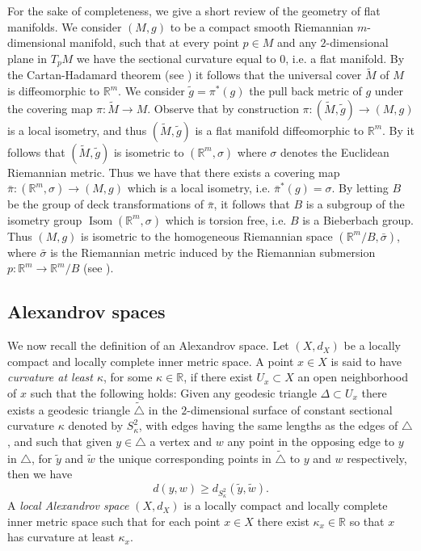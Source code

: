 \documentclass[12pt,a4paper,reqno]{amsart}
\theoremstyle{definition}
\numberwithin{equation}{section}
\newcommand{\R}{\mathbb{R}} %
\DeclareMathOperator{\Iso}{Isom}
\begin{document}
For the sake of completeness, we give a short review of the geometry of flat manifolds. We consider $(M,g)$ to be a compact smooth Riemannian $m$-dimensional manifold, such that at every point $p\in M$ and any $2$-dimensional plane in $T_pM$ we have the sectional curvature equal to $0$, i.e. a flat manifold. By the Cartan-Hadamard theorem (see \cite[Theorem 3.1]{doCarmo}) it follows that the universal cover $\widetilde{M}$ of $M$ is diffeomorphic to $\R^m$. We consider $\widetilde{g}= \pi^\ast(g)$ the pull back metric of $g$ under the covering map $\pi\colon \widetilde{M}\to M$. Observe that by construction $\pi\colon (\widetilde{M},\widetilde{g})\to (M,g)$ is a local isometry, and thus $(\widetilde{M},\widetilde{g})$ is a flat manifold diffeomorphic to $\R^m$. By \cite[Theorem 4.1]{doCarmo} it follows that $(\widetilde{M},\widetilde{g})$ is isometric to $(\R^m,\sigma)$ where $\sigma$ denotes the Euclidean Riemannian metric. Thus we have that there exists a  covering map $\bar{\pi}\colon (\R^m,\sigma)\to (M,g)$ which is a local isometry, i.e. $\bar{\pi}^\ast(g) = \sigma$. By letting $B$ be the group of deck transformations of $\bar{\pi}$, it follows that $B$ is a subgroup of the isometry group $\Iso(\R^m,\sigma)$ which is torsion free, i.e. $B$ is a Bieberbach group. Thus $(M,g)$ is isometric to the homogeneous Riemannian space $(\R^m/B,\bar{\sigma})$,  where $\bar{\sigma}$ is the Riemannian metric induced by the Riemannian submersion $p\colon \R^m\to \R^m/B$ (see \cite[Theorem 1.2.1]{GromollWalschap}).

\subsection{Alexandrov spaces}\label{SS: Alexandrov geometry}
We now recall the definition of an Alexandrov space. Let $(X,d_X)$ be a locally compact and locally complete inner metric space. A point $x\in X$ is said to have \emph{curvature at least $\kappa$}, for some $\kappa\in \R$, if there exist $U_x\subset X$ an open neighborhood of $x$ such that the following holds:
Given any geodesic triangle $\Delta\subset U_x$ there exists a geodesic triangle $\widetilde{\triangle}$ in  the $2$-dimensional surface of constant sectional curvature $\kappa$ denoted by $S^2_{\kappa}$, with edges having the same lengths as the edges of $\triangle$, and such that given $y\in \triangle$ a vertex and $w$ any point in the opposing edge to $y$ in $\triangle$, for  $\tilde{y}$ and $\tilde{w}$ the unique corresponding points in $\widetilde{\triangle}$ to $y$ and $w$ respectively, then we have
\[
d(y,w) \geq d_{S^2_{\kappa}}(\tilde{y},\tilde{w}).
\]
A \emph{local Alexandrov space} $(X,d_X)$ is a locally compact and locally complete inner metric space such that for each point $x\in X$ there exist $\kappa_x\in\R$ so that $x$ has curvature at least $\kappa_x$. 
\end{document}
